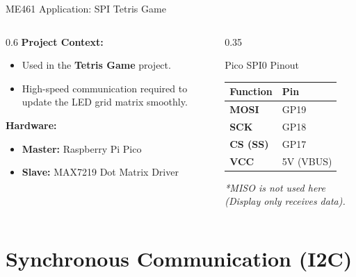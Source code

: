 \begin{frame}{ME461 Application: SPI Tetris Game}
\begin{columns}
    \begin{column}{0.6\textwidth}
        \textbf{Project Context:}
        \begin{itemize}
            \item Used in the \textbf{Tetris Game} project.
            \item High-speed communication required to update the LED grid matrix smoothly.
        \end{itemize}
        
        \vspace{0.2cm}
        \textbf{Hardware:}
        \begin{itemize}
            \item \textbf{Master:} Raspberry Pi Pico
            \item \textbf{Slave:} MAX7219 Dot Matrix Driver
        \end{itemize}
    \end{column}
    
    \begin{column}{0.35\textwidth}
        \begin{block}{Pico SPI0 Pinout}
        \centering
        \begin{tabular}{ll}
        \toprule
        \textbf{Function} & \textbf{Pin} \\
        \midrule
        \textbf{MOSI} & GP19 \\
        \textbf{SCK} & GP18 \\
        \textbf{CS (SS)} & GP17 \\
        \textbf{VCC} & 5V (VBUS) \\
        \bottomrule
        \end{tabular}
        \end{block}
        
        \vspace{0.2cm}
        \footnotesize \textit{*MISO is not used here (Display only receives data).}
    \end{column}
\end{columns}
\end{frame}




\section{Synchronous Communication (I2C)}

